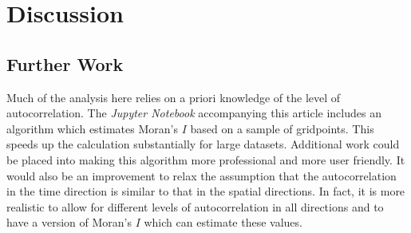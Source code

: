 \documentclass[ijgi,article,submit,moreauthors,pdftex,10pt,a4paper]{Definitions/mdpi}
\begin{document}






\section{Discussion}


\subsection{Further Work}
\label{sec:Discussion/Further Work}

Much of the analysis here relies on a priori knowledge of the level of autocorrelation. The \textit{Jupyter Notebook} accompanying this article includes an algorithm which estimates Moran's $I$ based on a sample of gridpoints. This speeds up the calculation substantially for large datasets. Additional work could be placed into making this algorithm more professional and more user friendly. It would also be an improvement to relax the assumption that the autocorrelation in the time direction is similar to that in the spatial directions. In fact, it is more realistic to allow for different levels of autocorrelation in all directions and to have a version of Moran's $I$ which can estimate these values.
\end{document}

